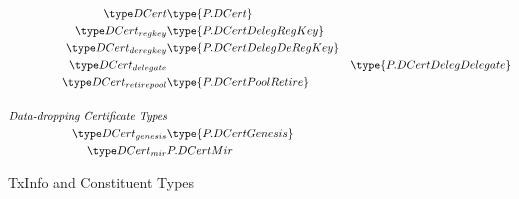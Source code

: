 \begin{figure*}[htb]
\begin{align*}
    \DCert & \type{P.DCert} \\
    \DCertRegKey & \type{P.DCertDelegRegKey} \\
    \DCertDeRegKey & \type{P.DCertDelegDeRegKey} \\
    \DCertDeleg & & \type{P.DCertDelegDelegate} \\
    \DCertRetirePool & \type{P.DCertPoolRetire} \\
    ~\\
    \emph{Data-dropping Certificate Types} \\
    \DCertGen & \type{P.DCertGenesis} \\
    \DCertMir & {P.DCertMir} \\
  \end{align*}
  \caption{TxInfo and Constituent Types}
  \label{fig:txinfo-types}
\end{figure*}

